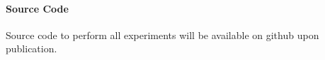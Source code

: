 \documentclass[letterpaper]{article}
\begin{document}


\paragraph{Source Code}
Source code to perform all experiments will be available on github upon publication.







\end{document}

